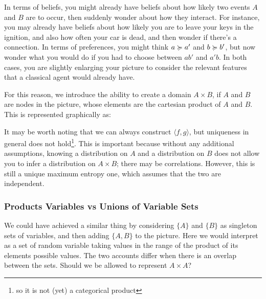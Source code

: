 \documentclass{article}
\begin{document}
	In terms of beliefs, you might already have beliefs about how likely two events $A$ and $B$ are to occur, then suddenly wonder about how they interact. For instance, you may already have beliefs about how likely you are to leave your keys in the ignition, and also how often your car is dead, and then wonder if there's a connection. 
	In terms of preferences, you might think $a \succcurlyeq a'$ and $b \succcurlyeq b'$, but now wonder what you would do if you had to choose between $a b'$ and $a' b$. In both cases, you are slightly enlarging your picture to consider the relevant features that a classical agent would already have.
	
	For this reason, we introduce the ability to create a domain $A \times B$, if $A$ and $B$ are nodes in the picture, whose elements are the cartesian product of $A$ and $B$. %
	This is represented graphically as:
	\begin{center}
	\end{center}
	
	It may be worth noting that we can always construct $\langle f, g \rangle$, but uniqueness in general does not hold\footnote{so it is not (yet) a categorical product}. This is important because without any additional assumptions, knowing a distribution on $A$ and a distribution on $B$ does not allow you to infer a distribution on $A \times B$; there may be correlations. However, this is still a unique maximum entropy one, which assumes that the two are independent.
	
	\subsubsection{Products Variables vs Unions of Variable Sets}
	
	We could have achieved a similar thing by considering $\{A\}$ and $\{B\}$ as singleton sets of variables, and then adding $\{A,B\}$ to the picture. Here we would interpret as a set of random variable taking values in the range of the product of its elements possible values. The two accounts differ when there is an overlap between the sets. Should we be allowed to represent $A \times A$? 
	
\end{document}
